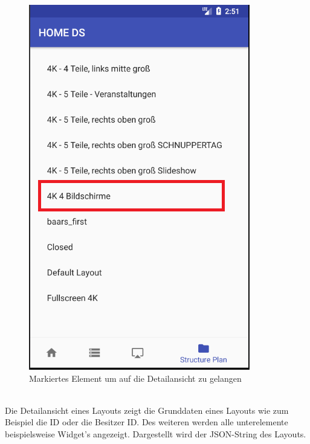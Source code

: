 \begin{figure}[H]
\centering
\includegraphics[scale=0.35]{images/06_AndroidApp/06_StructureNavigationToDetail}
\caption{Markiertes Element um auf die Detailansicht zu gelangen}
\label{fig:mediaNav}
\end{figure}
\\
Die Detailansicht eines Layouts zeigt die Grunddaten eines Layouts wie zum Beispiel die ID oder die Besitzer ID. Des weiteren werden alle unterelemente beispielsweise Widget's angezeigt. Dargestellt wird der JSON-String des Layouts.
\\
